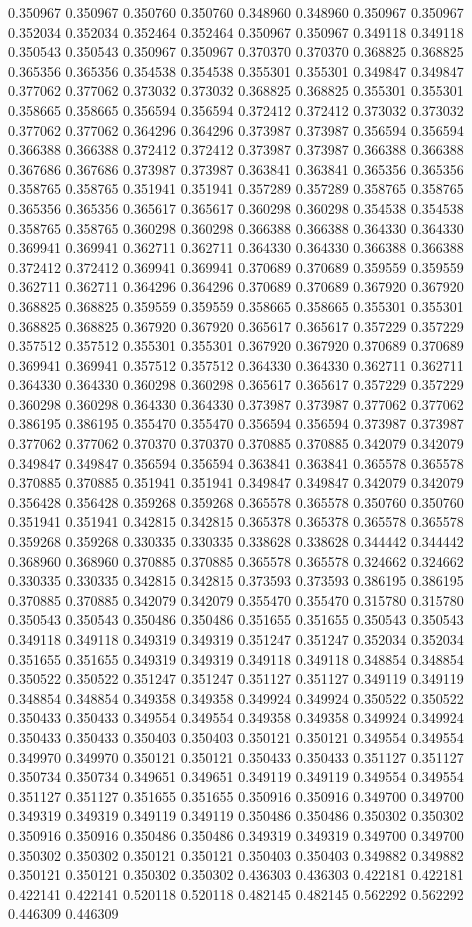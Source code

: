 0.350967 0.350967 0.350760 0.350760 0.348960 0.348960 0.350967 0.350967 0.352034 0.352034 0.352464 0.352464 0.350967 0.350967 0.349118 0.349118 0.350543 0.350543 0.350967 0.350967 0.370370 0.370370 0.368825 0.368825 0.365356 0.365356 0.354538 0.354538 0.355301 0.355301 0.349847 0.349847 0.377062 0.377062 0.373032 0.373032 0.368825 0.368825 0.355301 0.355301 0.358665 0.358665 0.356594 0.356594 0.372412 0.372412 0.373032 0.373032 0.377062 0.377062 0.364296 0.364296 0.373987 0.373987 0.356594 0.356594 0.366388 0.366388 0.372412 0.372412 0.373987 0.373987 0.366388 0.366388 0.367686 0.367686 0.373987 0.373987 0.363841 0.363841 0.365356 0.365356 0.358765 0.358765 0.351941 0.351941 0.357289 0.357289 0.358765 0.358765 0.365356 0.365356 0.365617 0.365617 0.360298 0.360298 0.354538 0.354538 0.358765 0.358765 0.360298 0.360298 0.366388 0.366388 0.364330 0.364330 0.369941 0.369941 0.362711 0.362711 0.364330 0.364330 0.366388 0.366388 0.372412 0.372412 0.369941 0.369941 0.370689 0.370689 0.359559 0.359559 0.362711 0.362711 0.364296 0.364296 0.370689 0.370689 0.367920 0.367920 0.368825 0.368825 0.359559 0.359559 0.358665 0.358665 0.355301 0.355301 0.368825 0.368825 0.367920 0.367920 0.365617 0.365617 0.357229 0.357229 0.357512 0.357512 0.355301 0.355301 0.367920 0.367920 0.370689 0.370689 0.369941 0.369941 0.357512 0.357512 0.364330 0.364330 0.362711 0.362711 0.364330 0.364330 0.360298 0.360298 0.365617 0.365617 0.357229 0.357229 0.360298 0.360298 0.364330 0.364330 0.373987 0.373987 0.377062 0.377062 0.386195 0.386195 0.355470 0.355470 0.356594 0.356594 0.373987 0.373987 0.377062 0.377062 0.370370 0.370370 0.370885 0.370885 0.342079 0.342079 0.349847 0.349847 0.356594 0.356594 0.363841 0.363841 0.365578 0.365578 0.370885 0.370885 0.351941 0.351941 0.349847 0.349847 0.342079 0.342079 0.356428 0.356428 0.359268 0.359268 0.365578 0.365578 0.350760 0.350760 0.351941 0.351941 0.342815 0.342815 0.365378 0.365378 0.365578 0.365578 0.359268 0.359268 0.330335 0.330335 0.338628 0.338628 0.344442 0.344442 0.368960 0.368960 0.370885 0.370885 0.365578 0.365578 0.324662 0.324662 0.330335 0.330335 0.342815 0.342815 0.373593 0.373593 0.386195 0.386195 0.370885 0.370885 0.342079 0.342079 0.355470 0.355470 0.315780 0.315780 0.350543 0.350543 0.350486 0.350486 0.351655 0.351655 0.350543 0.350543 0.349118 0.349118 0.349319 0.349319 0.351247 0.351247 0.352034 0.352034 0.351655 0.351655 0.349319 0.349319 0.349118 0.349118 0.348854 0.348854 0.350522 0.350522 0.351247 0.351247 0.351127 0.351127 0.349119 0.349119 0.348854 0.348854 0.349358 0.349358 0.349924 0.349924 0.350522 0.350522 0.350433 0.350433 0.349554 0.349554 0.349358 0.349358 0.349924 0.349924 0.350433 0.350433 0.350403 0.350403 0.350121 0.350121 0.349554 0.349554 0.349970 0.349970 0.350121 0.350121 0.350433 0.350433 0.351127 0.351127 0.350734 0.350734 0.349651 0.349651 0.349119 0.349119 0.349554 0.349554 0.351127 0.351127 0.351655 0.351655 0.350916 0.350916 0.349700 0.349700 0.349319 0.349319 0.349119 0.349119 0.350486 0.350486 0.350302 0.350302 0.350916 0.350916 0.350486 0.350486 0.349319 0.349319 0.349700 0.349700 0.350302 0.350302 0.350121 0.350121 0.350403 0.350403 0.349882 0.349882 0.350121 0.350121 0.350302 0.350302 0.436303 0.436303 0.422181 0.422181 0.422141 0.422141 0.520118 0.520118 0.482145 0.482145 0.562292 0.562292 0.446309 0.446309 